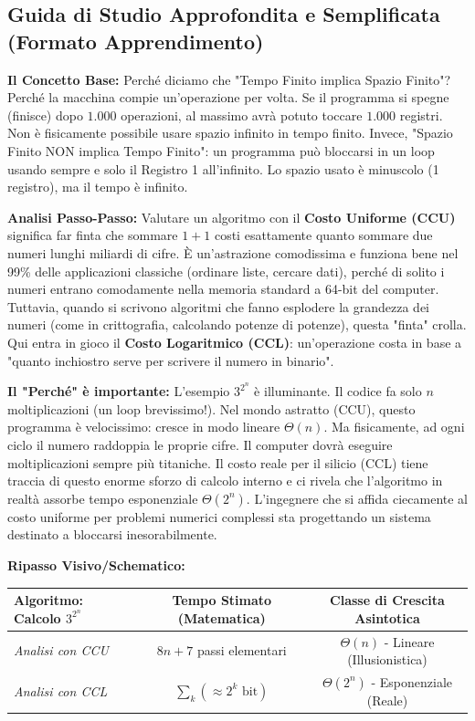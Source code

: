 \documentclass[a4paper, 11pt]{report}
\begin{document}
\vspace{0.5cm}
\subsection*{Guida di Studio Approfondita e Semplificata (Formato Apprendimento)}


\textbf{Il Concetto Base:}
Perché diciamo che "Tempo Finito implica Spazio Finito"? Perché la macchina compie un'operazione per volta. Se il programma si spegne (finisce) dopo $1.000$ operazioni, al massimo avrà potuto toccare $1.000$ registri. Non è fisicamente possibile usare spazio infinito in tempo finito.
Invece, "Spazio Finito NON implica Tempo Finito": un programma può bloccarsi in un loop usando sempre e solo il Registro 1 all'infinito. Lo spazio usato è minuscolo (1 registro), ma il tempo è infinito.

\textbf{Analisi Passo-Passo:}
Valutare un algoritmo con il \textbf{Costo Uniforme (CCU)} significa far finta che sommare $1+1$ costi esattamente quanto sommare due numeri lunghi miliardi di cifre. È un'astrazione comodissima e funziona bene nel 99\% delle applicazioni classiche (ordinare liste, cercare dati), perché di solito i numeri entrano comodamente nella memoria standard a 64-bit del computer.
Tuttavia, quando si scrivono algoritmi che fanno esplodere la grandezza dei numeri (come in crittografia, calcolando potenze di potenze), questa "finta" crolla. Qui entra in gioco il \textbf{Costo Logaritmico (CCL)}: un'operazione costa in base a "quanto inchiostro serve per scrivere il numero in binario".

\textbf{Il "Perché" è importante:}
L'esempio $3^{2^n}$ è illuminante. Il codice fa solo $n$ moltiplicazioni (un loop brevissimo!). Nel mondo astratto (CCU), questo programma è velocissimo: cresce in modo lineare $\Theta(n)$. Ma fisicamente, ad ogni ciclo il numero raddoppia le proprie cifre. Il computer dovrà eseguire moltiplicazioni sempre più titaniche. Il costo reale per il silicio (CCL) tiene traccia di questo enorme sforzo di calcolo interno e ci rivela che l'algoritmo in realtà assorbe tempo esponenziale $\Theta(2^n)$. L'ingegnere che si affida ciecamente al costo uniforme per problemi numerici complessi sta progettando un sistema destinato a bloccarsi inesorabilmente.

\textbf{Ripasso Visivo/Schematico:}
\begin{center}
\begin{tabular}{|l|c|c|}
\hline
\textbf{Algoritmo: Calcolo $3^{2^n}$} & \textbf{Tempo Stimato (Matematica)} & \textbf{Classe di Crescita Asintotica} \\
\hline
\textit{Analisi con CCU} & $8n + 7$ passi elementari & $\Theta(n)$ - Lineare (Illusionistica) \\
\hline
\textit{Analisi con CCL} & $\sum_{k} ( \approx 2^k \text{ bit})$ & $\Theta(2^n)$ - Esponenziale (Reale) \\
\hline
\end{tabular}
\end{center}
\end{document}
